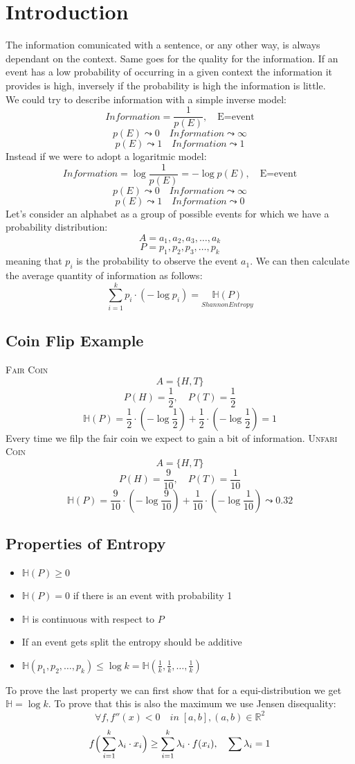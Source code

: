 \section{Introduction}
The information comunicated with a sentence, or any other way, is always dependant on the context. Same goes for the quality for the information. If an event has a low probability of occurring in a given context the information it provides is high, inversely if the probability is high the information is little.\\
We could try to describe information with a simple inverse model:
$$ Information = \frac{1}{p(E)}, \quad \text{E=event}$$
$$p(E)\leadsto 0 \quad Information \leadsto \infty$$
$$p(E)\leadsto 1 \quad Information \leadsto 1$$
Instead if we were to adopt a logaritmic model:
$$Information = \log{\frac{1}{p(E)}}=-\log{p(E)}, \quad \text{E=event}$$
$$p(E)\leadsto 0 \quad Information \leadsto \infty$$
$$p(E)\leadsto 1 \quad Information \leadsto 0$$
Let's consider an alphabet as a group of possible events for which we have a probability distribution:
$$A={a_1,a_2,a_3,\ldots,a_k}$$
$$P={p_1,p_2,p_3,\ldots,p_k}$$
meaning that $p_i$ is the probability to observe the event $a_1$. We can then calculate the average quantity of information as follows:
\begin{equation}
    \sum_{i=1}^{k}{p_i\cdot (-\log{p_i})} = \underset{Shannon Entropy}{\mathbb{H}(P)}
\end{equation}
\subsection{Coin Flip Example}
\textsc{Fair Coin}
$$A=\{H,T\}$$
$$P(H)=\frac{1}{2},\quad P(T)=\frac{1}{2}$$
$$\mathbb{H}(P)=\frac{1}{2}\cdot(-\log{\frac{1}{2}})+\frac{1}{2}\cdot(-\log{\frac{1}{2}})=1$$
Every time we filp the fair coin we expect to gain a bit of information.
\textsc{Unfari Coin}
$$A=\{H,T\}$$
$$P(H)=\frac{9}{10},\quad P(T)=\frac{1}{10}$$
$$\mathbb{H}(P)=\frac{9}{10}\cdot(-\log{\frac{9}{10}})+\frac{1}{10}\cdot(-\log{\frac{1}{10}})\leadsto 0.32$$
\subsection{Properties of Entropy}
\begin{itemize}
    \item $\mathbb{H}(P)\geq 0$
    \item $\mathbb{H}(P) = 0$ if there is an event with probability 1
    \item $\mathbb{H}$ is continuous with respect to $P$
    \item If an event gets split the entropy should be additive
    \item $\mathbb{H}(p_1,p_2,\ldots,p_k)\leq \log{k}= \mathbb{H}(\frac{1}{k},\frac{1}{k},\ldots,\frac{1}{k})$
\end{itemize}
To prove the last property we can first show that for a equi-distribution we get $\mathbb{H}=\log{k}$. To prove that this is also the maximum we use Jensen disequality:
$$\forall f, f''(x)<0 \quad in\;[a,b], (a,b)\in \mathbb{R}^2$$
$$f\Big{(}\sum_{i=1}^{k}{\lambda_i\cdot x_i}\Big{)}\geq\sum_{i=1}^{k}{\lambda_i\cdot f(x_i)}, \quad \sum{\lambda_i} = 1$$

